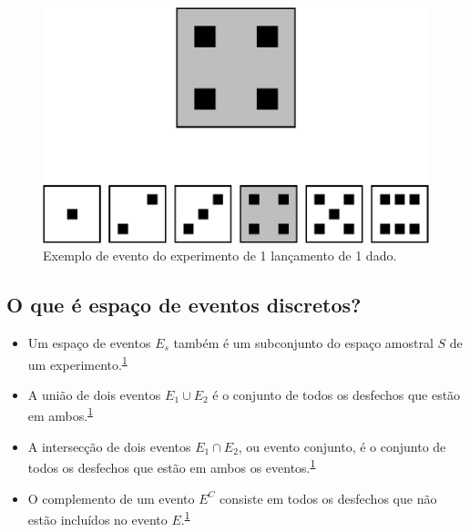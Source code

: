 \documentclass[
  a4paper,
]{book}
\begin{document}
\begin{figure}

{\centering \includegraphics{Ciencia-com-R_files/figure-latex/evento-dado-1} 

}

\caption{Exemplo de evento do experimento de 1 lançamento de 1 dado.}\label{fig:evento-dado}
\end{figure}

\hypertarget{o-que-uxe9-espauxe7o-de-eventos-discretos}{%
\subsection{O que é espaço de eventos discretos?}\label{o-que-uxe9-espauxe7o-de-eventos-discretos}}

\begin{itemize}
\item
  Um espaço de eventos \(E_{s}\) também é um subconjunto do espaço amostral \(S\) de um experimento.\textsuperscript{\protect\hyperlink{ref-grami2023}{1}}
\item
  A união de dois eventos \(E_{1} \cup E_{2}\) é o conjunto de todos os desfechos que estão em ambos.\textsuperscript{\protect\hyperlink{ref-grami2023}{1}}
\item
  A intersecção de dois eventos \(E_{1} \cap E_{2}\), ou evento conjunto, é o conjunto de todos os desfechos que estão em ambos os eventos.\textsuperscript{\protect\hyperlink{ref-grami2023}{1}}
\item
  O complemento de um evento \(E^C\) consiste em todos os desfechos que não estão incluídos no evento \(E\).\textsuperscript{\protect\hyperlink{ref-grami2023}{1}}
\end{itemize}
\end{document}
